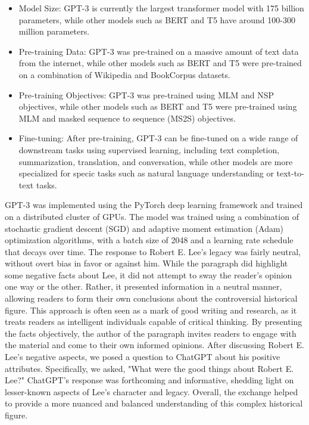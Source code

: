 \documentclass[letterpaper, 10 pt, conference]{ieeeconf}  %
\begin{document}
\begin{itemize}
    \item Model Size: GPT-3 is currently the largest transformer model with 175 billion parameters, while other models such as
BERT and T5 have around 100-300 million parameters.
    \item Pre-training Data: GPT-3 was pre-trained on a massive amount of text data from the internet, while other models such
as BERT and T5 were pre-trained on a combination of Wikipedia and BookCorpus datasets.
    \item Pre-training Objectives: GPT-3 was pre-trained using MLM and NSP objectives, while other models such as BERT
and T5 were pre-trained using MLM and masked sequence to sequence (MS2S) objectives.
    \item Fine-tuning: After pre-training, GPT-3 can be fine-tuned on a wide range of downstream tasks using supervised
learning, including text completion, summarization, translation, and conversation, while other models are more
specialized for specic tasks such as natural language understanding or text-to-text tasks.

\end{itemize}

GPT-3 was implemented using the PyTorch deep learning framework and trained on a distributed cluster of GPUs. The model
was trained using a combination of stochastic gradient descent (SGD) and adaptive moment estimation (Adam) optimization
algorithms, with a batch size of 2048 and a learning rate schedule that decays over time.
The response to Robert E. Lee's legacy was fairly neutral, without overt bias in favor or against him. While the paragraph did
highlight some negative facts about Lee, it did not attempt to sway the reader's opinion one way or the other. Rather, it presented
information in a neutral manner, allowing readers to form their own conclusions about the controversial historical figure. This
approach is often seen as a mark of good writing and research, as it treats readers as intelligent individuals capable of critical
thinking. By presenting the facts objectively, the author of the paragraph invites readers to engage with the material and come to
their own informed opinions.
After discussing Robert E. Lee's negative aspects, we posed a question to ChatGPT about his positive attributes. Specifically, we
asked, "What were the good things about Robert E. Lee?" ChatGPT's response was forthcoming and informative, shedding light
on lesser-known aspects of Lee's character and legacy. Overall, the exchange helped to provide a more nuanced and balanced
understanding of this complex historical figure.
\end{document}
